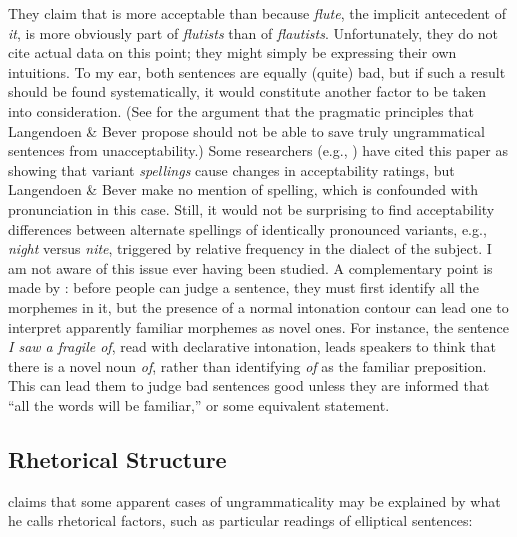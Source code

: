  \noindent
They claim that  is more acceptable than  because \textit{flute}, the implicit antecedent of \textit{it}, is more obviously part of \textit{flutists} than of \textit{flautists}. Unfortunately, they do not cite actual data on this point; they might simply be expressing their own intuitions. To my ear, both sentences are equally (quite) bad, but if such a result should be found systematically, it would constitute another factor to be taken into consideration. (See \citealt{Smith1981} for the argument that the pragmatic principles that Langendoen \& Bever propose should not be able to save truly ungrammatical sentences from unacceptability.) Some researchers (e.g., \citealt{Birdsong1989}) have cited this paper as showing that variant \textit{spellings} cause changes in acceptability ratings, but Langendoen \& Bever make no mention of spelling, which is confounded with pronunciation in this case. Still, it would not be surprising to find acceptability differences between alternate spellings of identically pronounced variants, e.g., \textit{night} versus \textit{nite}, triggered by relative frequency in the dialect of the subject. I am not aware of this issue ever having been studied. A
complementary point is made by \citet{Hill1961}: before people can judge a sentence, they must first identify all the morphemes in it, but the presence of a normal intonation contour can lead one to interpret apparently familiar morphemes as novel ones. For instance, the sentence \textit{I saw a fragile of}, read with declarative intonation, leads speakers to think that there is a novel noun \textit{of}, rather than identifying \textit{of} as the familiar preposition. This can lead them to judge bad sentences good unless they are informed that ``all the words will be familiar,'' or some equivalent statement.

\subsection{Rhetorical Structure}\label{sec:5.3.7} 

\citet{Langendoen1972} claims that some apparent cases of ungrammaticality may be explained by what he calls rhetorical factors, such as particular readings of elliptical sentences:

